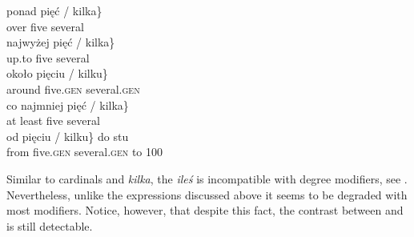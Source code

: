 \documentclass[output=paper, newtxmath, colorlinks, citecolor=brown]{langsci/langscibook}
\begin{document}
\begin{multicols}{2}
		\ea \label{ex:numeral-modifiers-cardinals-kilka} \ea \gll ponad \minsp{\{} pięć / {kilka\}}\\
		over {} five {} several\\
		\ex \gll najwyżej \minsp{\{} pięć / {kilka\}}\\
		up.to {} five {} several\\
		\ex \gll około \minsp{\{} pięciu / {kilku\}}\\
		around {} five.\textsc{gen} {} several.\textsc{gen}\\
		\ex \gll co najmniej \minsp{\{} pięć / {kilka\}}\\
		at least {} five {} several\\
		\ex \gll od \minsp{\{} pięciu / {kilku\}} do stu\\
		from {} five.\textsc{gen} {} several.\textsc{gen} to 100\\
		\z
        \z

	\end{multicols}

	\noindent Similar to cardinals and \textit{kilka}, the  \textit{ileś} is incompatible with degree modifiers, see . Nevertheless, unlike the expressions discussed above it seems to be degraded with most  modifiers. Notice, however, that despite this fact, the contrast between  and  is still detectable.

	\begin{multicols}{2}

		\ea \label{ex:degree-modifiers-iles}
	\columnbreak

		\z
        \z
		\end{multicols}
\end{document}
